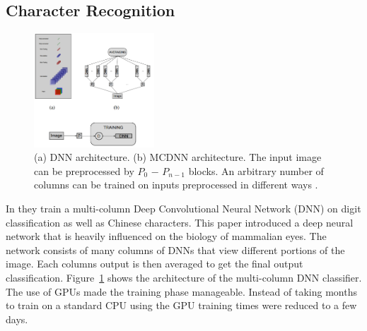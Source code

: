 \documentclass[font=12pt]{article}
\begin{document}
\subsection{Character Recognition}
\begin{figure}
\centering
\includegraphics[width=0.4\textwidth]{DNNarchitecture}
\caption{(a) DNN architecture. (b) MCDNN architecture. The input image can be preprocessed by $P_0$ − $P_{n−1}$ blocks. An arbitrary number of columns can be trained on inputs preprocessed in different ways \cite{6248110}.}
\label{fig:multicolumn}
\end{figure}
In \cite{6248110} they train a multi-column Deep Convolutional Neural Network (DNN) on digit classification as well as Chinese characters. This paper introduced a deep neural network that is heavily influenced on the biology of mammalian eyes. The network consists of many columns of DNNs that view different portions of the image. Each columns output is then averaged to get the final output classification. Figure~\ref{fig:multicolumn} shows the architecture of the multi-column DNN classifier. The use of GPUs made the training phase manageable. Instead of taking months to train on a standard CPU using the GPU training times were reduced to a few days.
\end{document}
